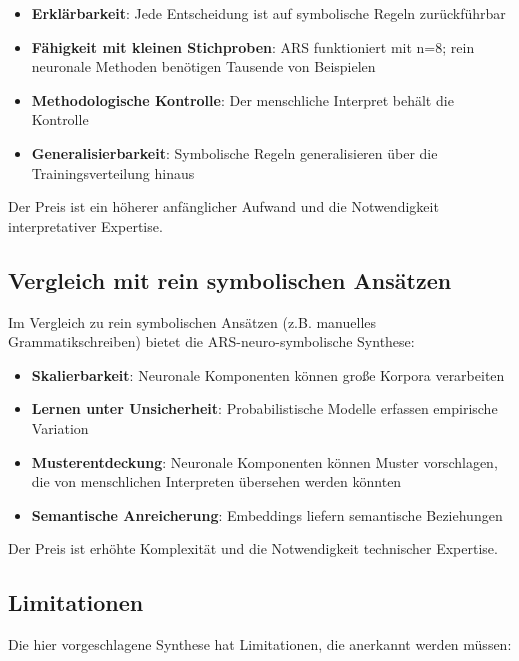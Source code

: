 \documentclass[12pt,a4paper]{article}
\begin{document}
\begin{itemize}
    \item \textbf{Erklärbarkeit}: Jede Entscheidung ist auf symbolische Regeln 
    zurückführbar
    \item \textbf{Fähigkeit mit kleinen Stichproben}: ARS funktioniert mit n=8; 
    rein neuronale Methoden benötigen Tausende von Beispielen
    \item \textbf{Methodologische Kontrolle}: Der menschliche Interpret behält 
    die Kontrolle
    \item \textbf{Generalisierbarkeit}: Symbolische Regeln generalisieren über 
    die Trainingsverteilung hinaus
\end{itemize}

Der Preis ist ein höherer anfänglicher Aufwand und die Notwendigkeit interpretativer 
Expertise.

\subsection{Vergleich mit rein symbolischen Ansätzen}

Im Vergleich zu rein symbolischen Ansätzen (z.B. manuelles Grammatikschreiben) 
bietet die ARS-neuro-symbolische Synthese:

\begin{itemize}
    \item \textbf{Skalierbarkeit}: Neuronale Komponenten können große Korpora 
    verarbeiten
    \item \textbf{Lernen unter Unsicherheit}: Probabilistische Modelle erfassen 
    empirische Variation
    \item \textbf{Musterentdeckung}: Neuronale Komponenten können Muster vorschlagen, 
    die von menschlichen Interpreten übersehen werden könnten
    \item \textbf{Semantische Anreicherung}: Embeddings liefern semantische 
    Beziehungen
\end{itemize}

Der Preis ist erhöhte Komplexität und die Notwendigkeit technischer Expertise.

\subsection{Limitationen}

Die hier vorgeschlagene Synthese hat Limitationen, die anerkannt werden müssen:
\end{document}

